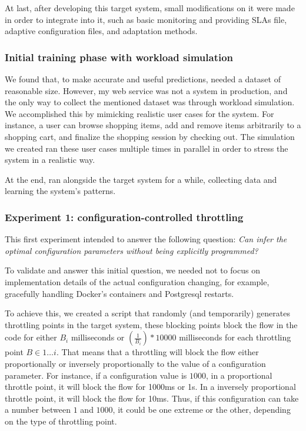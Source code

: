 At last, after developing this target system, small modifications on it were made in order to integrate \projectname{} into it, such as basic monitoring and providing SLAs file, adaptive configuration files, and adaptation methods.

\subsubsection{Initial training phase with workload simulation}


We found that, to make accurate and useful predictions, \projectname{} needed a dataset of reasonable size. However, my web service was not a system in production, and the only way to collect the mentioned dataset was through workload simulation. We accomplished this by mimicking realistic user cases for the system. For instance, a user can browse shopping items, add and remove  items arbitrarily to a shopping cart, and finalize the shopping session by checking out. The simulation we created ran these user cases multiple times in parallel in order to stress the system in a realistic way. 

At the end, \projectname{} ran alongside the target system for a while, collecting data and learning the system's patterns.


\subsubsection{Experiment 1: configuration-controlled throttling}

This first experiment intended to answer the following question: \emph{Can \projectname{} infer the optimal configuration parameters without being explicitly programmed?}

To validate and answer this initial question, we needed not to focus on implementation details of the actual configuration changing, for example, gracefully handling Docker's containers and Postgresql restarts.

To achieve this, we created a script that randomly (and temporarily) generates throttling points in the target system, these blocking points block the flow in the code for either $B_i$ milliseconds or $(\frac{1}{B_i}) * 10000$ milliseconds for each throttling point $B \in 1 \dots i$. That means that a throttling will block the flow either proportionally or inversely proportionally to the value of a configuration parameter. For instance, if a configuration value is $1000$, in a proportional throttle point, it will block the flow for 1000ms or 1s. In a inversely proportional throttle point, it will block the flow for 10ms. Thus, if this configuration can take a number between $1$ and $1000$, it could be one extreme or the other, depending on the type of throttling point.

